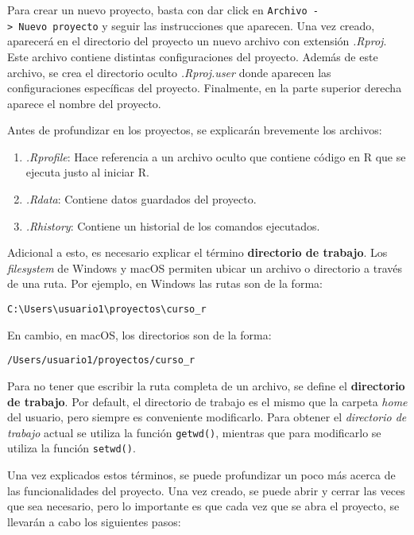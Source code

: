 \documentclass[]{book}
\providecommand{\tightlist}{%
  \setlength{\itemsep}{0pt}\setlength{\parskip}{0pt}}
\begin{document}
Para crear un nuevo proyecto, basta con dar click en \texttt{Archivo\ -\textgreater{}\ Nuevo\ proyecto} y seguir las instrucciones que aparecen. Una vez creado, aparecerá en el directorio del proyecto un nuevo archivo con extensión \emph{.Rproj}. Este archivo contiene distintas configuraciones del proyecto. Además de este archivo, se crea el directorio oculto \emph{.Rproj.user} donde aparecen las configuraciones específicas del proyecto. Finalmente, en la parte superior derecha aparece el nombre del proyecto.

Antes de profundizar en los proyectos, se explicarán brevemente los archivos:

\begin{enumerate}
\def\labelenumi{\arabic{enumi}.}
\tightlist
\item
  \emph{.Rprofile}: Hace referencia a un archivo oculto que contiene código en R que se ejecuta justo al iniciar R.
\item
  \emph{.Rdata}: Contiene datos guardados del proyecto.
\item
  \emph{.Rhistory}: Contiene un historial de los comandos ejecutados.
\end{enumerate}

Adicional a esto, es necesario explicar el término \textbf{directorio de trabajo}. Los \emph{filesystem} de Windows y macOS permiten ubicar un archivo o directorio a través de una ruta. Por ejemplo, en Windows las rutas son de la forma:

\texttt{C:\textbackslash{}Users\textbackslash{}usuario1\textbackslash{}proyectos\textbackslash{}curso\_r}

En cambio, en macOS, los directorios son de la forma:

\texttt{/Users/usuario1/proyectos/curso\_r}

Para no tener que escribir la ruta completa de un archivo, se define el \textbf{directorio de trabajo}. Por default, el directorio de trabajo es el mismo que la carpeta \emph{home} del usuario, pero siempre es conveniente modificarlo. Para obtener el \emph{directorio de trabajo} actual se utiliza la función \texttt{getwd()}, mientras que para modificarlo se utiliza la función \texttt{setwd()}.

Una vez explicados estos términos, se puede profundizar un poco más acerca de las funcionalidades del proyecto. Una vez creado, se puede abrir y cerrar las veces que sea necesario, pero lo importante es que cada vez que se abra el proyecto, se llevarán a cabo los siguientes pasos:
\end{document}
